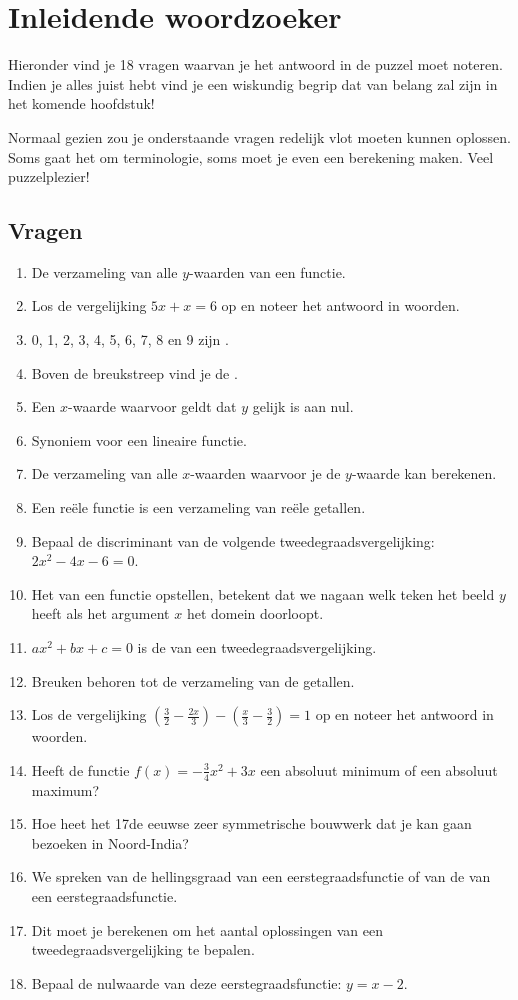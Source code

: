 \documentclass[12pt]{article}
\begin{document}
\onehalfspacing

\vspace*{-2cm}
\section*{Inleidende woordzoeker}
Hieronder vind je 18 vragen waarvan je het antwoord in de puzzel moet noteren. Indien je alles juist hebt vind je een wiskundig begrip dat van belang zal zijn in het komende hoofdstuk!

Normaal gezien zou je onderstaande vragen redelijk vlot moeten kunnen oplossen. Soms gaat het om terminologie, soms moet je even een berekening maken. Veel puzzelplezier!

\subsection*{Vragen}

\begin{enumerate}
  \item De verzameling van alle $y$-waarden van een functie.
  \item Los de vergelijking $5x+x=6$ op en noteer het antwoord in woorden.
  \item 0, 1, 2, 3, 4, 5, 6, 7, 8 en 9 zijn \arule{4cm}.
  \item Boven de breukstreep vind je de \arule{4cm}.
  \item Een $x$-waarde waarvoor geldt dat $y$ gelijk is aan nul.
  \item Synoniem voor een lineaire functie.
  \item De verzameling van alle $x$-waarden waarvoor je de $y$-waarde kan berekenen.
  \item Een reële functie is een verzameling van \arule{4cm} reële getallen.
  \item Bepaal de discriminant van de volgende tweedegraadsvergelijking: $2x^2-4x-6=0$.
  \item Het \arule{4cm} van een functie opstellen, betekent dat we nagaan welk teken het beeld $y$ heeft als het argument $x$ het domein doorloopt.
  \item $ax^2+bx+c=0$ is de \arule{4cm} van een tweedegraadsvergelijking.
  \item Breuken behoren tot de verzameling van de \arule{4cm} getallen.
  \item Los de vergelijking $\left(\frac{3}{2}-\frac{2x}{3}\right)-\left(\frac{x}{3}-\frac{3}{2}\right)=1$ op en noteer het antwoord in woorden.
  \item Heeft de functie $f(x)=-\frac{3}{4}x^2+3x$ een absoluut minimum of een absoluut maximum?
  \item Hoe heet het 17de eeuwse zeer symmetrische bouwwerk dat je kan gaan bezoeken in Noord-India?
  \item We spreken van de hellingsgraad van een eerstegraadsfunctie of van de \arule{3cm} van een eerstegraadsfunctie.
  \item Dit moet je berekenen om het aantal oplossingen van een tweedegraadsvergelijking te bepalen.
  \item Bepaal de nulwaarde van deze eerstegraadsfunctie: $y=x-2$.
\end{enumerate}
\end{document}
